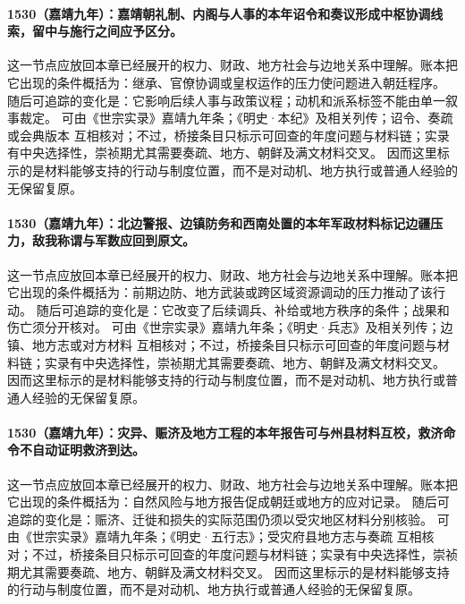 \paragraph{1530（嘉靖九年）：嘉靖朝礼制、内阁与人事的本年诏令和奏议形成中枢协调线索，留中与施行之间应予区分。} 这一节点应放回本章已经展开的权力、财政、地方社会与边地关系中理解。账本把它出现的条件概括为：继承、官僚协调或皇权运作的压力使问题进入朝廷程序。 随后可追踪的变化是：它影响后续人事与政策议程；动机和派系标签不能由单一叙事裁定。 可由《世宗实录》嘉靖九年条；《明史·本纪》及相关列传；诏令、奏疏或会典版本 互相核对；不过，桥接条目只标示可回查的年度问题与材料链；实录有中央选择性，崇祯期尤其需要奏疏、地方、朝鲜及满文材料交叉。 因而这里标示的是材料能够支持的行动与制度位置，而不是对动机、地方执行或普通人经验的无保留复原。

\paragraph{1530（嘉靖九年）：北边警报、边镇防务和西南处置的本年军政材料标记边疆压力，敌我称谓与军数应回到原文。} 这一节点应放回本章已经展开的权力、财政、地方社会与边地关系中理解。账本把它出现的条件概括为：前期边防、地方武装或跨区域资源调动的压力推动了该行动。 随后可追踪的变化是：它改变了后续调兵、补给或地方秩序的条件；战果和伤亡须分开核对。 可由《世宗实录》嘉靖九年条；《明史·兵志》及相关列传；边镇、地方志或对方材料 互相核对；不过，桥接条目只标示可回查的年度问题与材料链；实录有中央选择性，崇祯期尤其需要奏疏、地方、朝鲜及满文材料交叉。 因而这里标示的是材料能够支持的行动与制度位置，而不是对动机、地方执行或普通人经验的无保留复原。

\paragraph{1530（嘉靖九年）：灾异、赈济及地方工程的本年报告可与州县材料互校，救济命令不自动证明救济到达。} 这一节点应放回本章已经展开的权力、财政、地方社会与边地关系中理解。账本把它出现的条件概括为：自然风险与地方报告促成朝廷或地方的应对记录。 随后可追踪的变化是：赈济、迁徙和损失的实际范围仍须以受灾地区材料分别核验。 可由《世宗实录》嘉靖九年条；《明史·五行志》；受灾府县地方志与奏疏 互相核对；不过，桥接条目只标示可回查的年度问题与材料链；实录有中央选择性，崇祯期尤其需要奏疏、地方、朝鲜及满文材料交叉。 因而这里标示的是材料能够支持的行动与制度位置，而不是对动机、地方执行或普通人经验的无保留复原。

